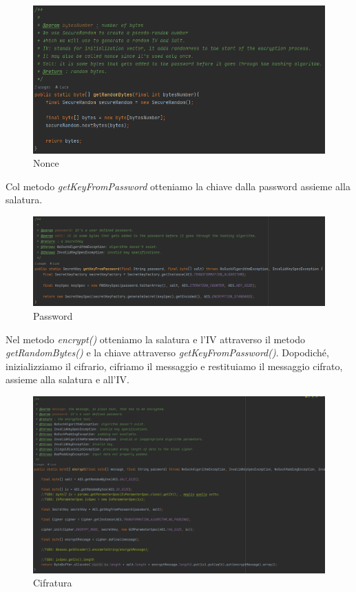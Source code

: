 \begin{figure}[H]
	\centering
	\includegraphics[width=1\textwidth, height=1\textheight, keepaspectratio]{./images/code/java/nonce_getRandomBytes.PNG}
	\caption{Nonce}
	\label{fig:nonce_getRandomBytes}
\end{figure}

\textsf{\small Col metodo \emph{getKeyFromPassword} otteniamo la chiave dalla password assieme alla salatura.} %

\begin{figure}[H]
	\centering
	\includegraphics[width=1\textwidth, height=1\textheight, keepaspectratio]{./images/code/java/getKeyFromPassword.PNG}
	\caption{Password}
	\label{fig:getKeyFromPassword}
\end{figure}

\textsf{\small Nel metodo \emph{encrypt()} otteniamo la salatura e l'IV attraverso il metodo \emph{getRandomBytes()} e la chiave attraverso \emph{getKeyFromPassword()}. Dopodiché, inizializziamo il cifrario, cifriamo il messaggio e restituiamo il messaggio cifrato, assieme alla salatura e all'IV.} %

\begin{figure}[H]
	\centering
	\includegraphics[width=1\textwidth, height=1\textheight, keepaspectratio]{./images/code/java/encrypt.PNG}
	\caption{Cifratura}
	\label{fig:encrypt_java}
\end{figure}


